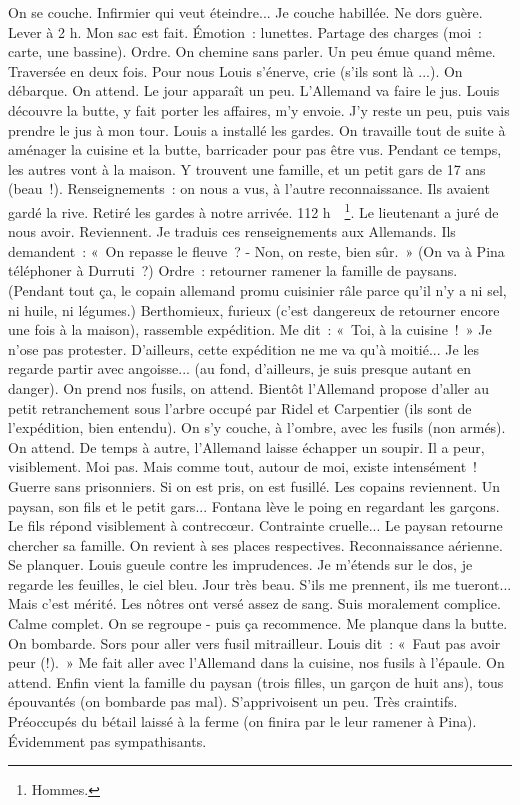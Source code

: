 \documentclass[french,twoside]{book} %
\begin{document}
On se couche. Infirmier qui veut éteindre... Je couche habillée. Ne dors guère. Lever à 2 h. Mon sac est fait. Émotion : lunettes. Partage des charges (moi : carte, une bassine). Ordre. On chemine sans parler. Un peu émue quand même. Traversée en deux fois. Pour nous Louis s'énerve, crie (s'ils sont là ...). On débarque. On attend. Le jour apparaît un peu. L'Allemand va faire le jus. Louis découvre la butte, y fait porter les affaires, m'y envoie. J'y reste un peu, puis vais prendre le jus à mon tour. Louis a installé les gardes. On travaille tout de suite à aménager la cuisine et la butte, barricader pour pas être vus. Pendant ce temps, les autres vont à la maison. Y trouvent une famille, et un petit gars de 17 ans (beau !). Renseignements : on nous a vus, à l'autre recon­naissance. Ils avaient gardé la rive. Retiré les gardes à notre arrivée. 112 h  \footnote{Hommes.}. Le lieutenant a juré de nous avoir. Reviennent. Je traduis ces renseigne­ments aux Allemands. Ils demandent : « On repasse le fleuve ? - Non, on reste, bien sûr. » (On va à Pina téléphoner à Durruti ?) Ordre : retourner rame­ner la famille de paysans. (Pendant tout ça, le copain allemand promu cuisinier râle parce qu'il n'y a ni sel, ni huile, ni légumes.) Berthomieux, furieux (c'est dangereux de retourner encore une fois à la maison), rassemble expédition. Me dit : « Toi, à la cuisine ! » Je n'ose pas protester. D'ailleurs, cette expédi­tion ne me va qu'à moitié... Je les regarde partir avec angoisse... (au fond, d'ailleurs, je suis presque autant en danger). On prend nos fusils, on attend. Bientôt l'Allemand propose d'aller au petit retranchement sous l'arbre occupé par Ridel et Carpentier (ils sont de l'expédition, bien entendu). On s'y couche, à l'ombre, avec les fusils (non armés). On attend. De temps à autre, l'Allemand laisse échapper un soupir. Il a peur, visiblement. Moi pas. Mais comme tout, autour de moi, existe intensément ! Guerre sans prisonniers. Si on est pris, on est fusillé. Les copains reviennent. Un paysan, son fils et le petit gars... Fontana lève le poing en regardant les garçons. Le fils répond visiblement à contrecœur. Contrainte cruelle... Le paysan retourne chercher sa famille. On revient à ses places respectives. Reconnaissance aérienne. Se planquer. Louis gueule contre les imprudences. Je m'étends sur le dos, je regarde les feuilles, le ciel bleu. Jour très beau. S'ils me prennent, ils me tueront... Mais c'est mérité. Les nôtres ont versé assez de sang. Suis moralement complice. Calme complet. On se regroupe - puis ça recommence. Me planque dans la butte. On bombarde. Sors pour aller vers fusil mitrailleur. Louis dit : « Faut pas avoir peur (!). » Me fait aller avec l'Allemand dans la cuisine, nos fusils à l'épaule. On attend. Enfin vient la famille du paysan (trois filles, un garçon de huit ans), tous épouvantés (on bombarde pas mal). S'apprivoisent un peu. Très craintifs. Préoccupés du bétail laissé à la ferme (on finira par le leur ramener à Pina). Évidemment pas sympathisants.\par
\end{document}
